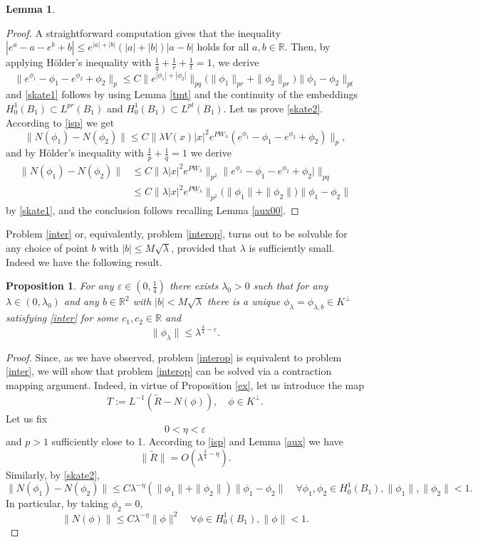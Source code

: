 \documentclass[reqno,11pt]{amsart}
\newtheorem{lemma}[thm]{Lemma}
\newtheorem{prop}[thm]{Proposition}
\theoremstyle{definition}
\numberwithin{equation}{section}
\newcommand{\R}{\mathbb{R}}
\newcommand{\la}{\lambda}
\newcommand{\e}{\varepsilon}
\renewcommand{\(}{\left(}
\renewcommand{\)}{\right)}
\renewcommand{\[}{\left[}
\renewcommand{\]}{\right]}
\newcommand{\beq}{\begin{equation}}
\newcommand{\eeq}{\end{equation}}
\begin{document}
{\begin{lemma}
 \end{lemma}
 \begin{proof}
A straightforward computation gives that  the inequality $|e^a-a-e^b+b|\leq e^{|a|+|b|}(|a|+|b|)|a-b|$ holds  for all $a,b\in \R$. Then, by applying H\"older's inequality with $\frac1q+\frac1r+\frac1t=1$, we derive
$$\|e^{\phi_1}-\phi_1-e^{\phi_2}+\phi_2\|_p\leq C\|e^{|\phi_1|+|\phi_2|}\|_{pq}\big(\|\phi_1\|_{pr}+\|\phi_2\|_{pr}\big)\|\phi_1-\phi_2\|_{pt}$$
 and \eqref{skate1} follows by using Lemma \ref{tmt} and the continuity of the embeddings $H^1_0(B_1)\subset L^{pr}(B_1)$ and $H^1_0(B_1)\subset L^{pt}(B_1)$. 
  Let us prove \eqref{skate2}. According to \eqref{isp}  we get
 $$\|N(\phi_1)-N(\phi_2)\|\leq C\|\la V(x)|x|^{2} e^{PW_\la}(e^{\phi_1}-\phi_1-e^{\phi_2}+\phi_2)\|_p,$$
and by H\"older's inequality with $\frac1p+\frac1q=1$ we derive 
$$\begin{aligned}\|N(\phi_1)-N(\phi_2)\|&\leq C\|\la |x|^{2}e^{PW_\la}\|_{p^2}\|e^{\phi_1}-\phi_1-e^{\phi_2}+\phi_2|\|_{pq}\\ &\leq C\|\la |x|^{2}e^{PW_\la}\|_{p^2}\big(\|\phi_1\|+\|\phi_2\|\big)\|\phi_1-\phi_2\|\end{aligned}
$$ by \eqref{skate1}, and  the conclusion follows recalling Lemma \ref{aux00}. 
 \end{proof}
Problem \eqref{inter} or, equivalently, problem \eqref{interop}, turns out to be solvable for any choice of point $b$ with $|b|\leq M\sqrt\la$, provided
that $\la$ is sufficiently small. Indeed we have the following result.

\begin{prop}\label{nonl} 
For any $\e\in (0,\frac14)$ there exists $\la_0>0$ such that for any $\la\in (0,\la_0)$ and any $b\in \R^2$ with $|b|<M\sqrt\la$ there is a unique $\phi_\la=\phi_{\la,b}\in K^\perp$ satisfying \eqref{inter} for some $c_1,c_2\in \R$ and  
$$\|\phi_{\la}\|\leq \la^{\frac34-\e}.$$ 
\end{prop}
\begin{proof} Since, as we have observed, problem \eqref{interop} is equivalent to problem \eqref{inter}, 
we will show that problem \eqref{interop} can be solved via a contraction mapping argument. Indeed, in virtue of Proposition \ref{ex}, let us introduce the map
$$T:=L^{-1}(\tilde R-N(\phi)),\quad \phi\in K^\perp.$$
 Let us fix $$0<\eta<\e$$ and $p>1$ sufficiently close to 1. According to \eqref{isp} and Lemma \ref{aux} we have
\beq\label{non1}\|\tilde R\|=O(\la^{\frac34-\eta}).\eeq
Similarly, by \eqref{skate2}, \beq\label{non2}\|N(\phi_1)-N(\phi_2)\|\leq C\la^{-\eta}(\|\phi_1\|+\|\phi_2\|)\|\phi_1-\phi_2\|\quad \forall \phi_1,\phi_2\in H_0^1(B_1), \|\phi_1\|,\|\phi_2\|<1.\eeq In particular, by taking $\phi_2=0$, 
\beq\label{non3}\|N(\phi)\|\leq C\la^{-\eta}\|\phi\|^2\quad \forall \phi\in H_0^1(B_1), \|\phi\|<1.\eeq 



\end{proof}}
\end{document}
